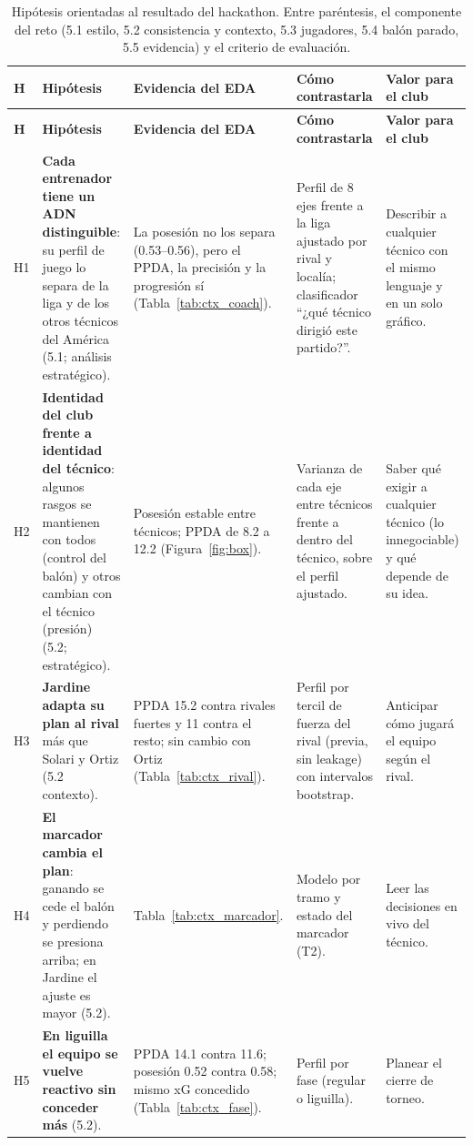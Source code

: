 \documentclass[11pt,a4paper]{article}
\begin{document}
{\small
\begin{longtable}{p{0.55cm}p{4.4cm}p{3.6cm}p{3.6cm}p{3.2cm}}
\caption{Hipótesis orientadas al resultado del hackathon. Entre paréntesis, el componente del reto (5.1 estilo, 5.2 consistencia y contexto, 5.3 jugadores, 5.4 balón parado, 5.5 evidencia) y el criterio de evaluación.}\label{tab:hipotesis}\\
\toprule \textbf{H} & \textbf{Hipótesis} & \textbf{Evidencia del EDA} & \textbf{Cómo contrastarla} & \textbf{Valor para el club}\\\midrule\endfirsthead
\toprule \textbf{H} & \textbf{Hipótesis} & \textbf{Evidencia del EDA} & \textbf{Cómo contrastarla} & \textbf{Valor para el club}\\\midrule\endhead
\bottomrule\endfoot
H1 & \textbf{Cada entrenador tiene un ADN distinguible}: su perfil de juego lo separa de la liga y de los otros técnicos del América (5.1; análisis estratégico). & La posesión no los separa (0.53--0.56), pero el PPDA, la precisión y la progresión sí (Tabla~\ref{tab:ctx_coach}). & Perfil de 8 ejes frente a la liga ajustado por rival y localía; clasificador ``¿qué técnico dirigió este partido?''. & Describir a cualquier técnico con el mismo lenguaje y en un solo gráfico.\\
H2 & \textbf{Identidad del club frente a identidad del técnico}: algunos rasgos se mantienen con todos (control del balón) y otros cambian con el técnico (presión) (5.2; estratégico). & Posesión estable entre técnicos; PPDA de 8.2 a 12.2 (Figura~\ref{fig:box}). & Varianza de cada eje entre técnicos frente a dentro del técnico, sobre el perfil ajustado. & Saber qué exigir a cualquier técnico (lo innegociable) y qué depende de su idea.\\
H3 & \textbf{Jardine adapta su plan al rival} más que Solari y Ortiz (5.2 contexto). & PPDA 15.2 contra rivales fuertes y 11 contra el resto; sin cambio con Ortiz (Tabla~\ref{tab:ctx_rival}). & Perfil por tercil de fuerza del rival (previa, sin leakage) con intervalos bootstrap. & Anticipar cómo jugará el equipo según el rival.\\
H4 & \textbf{El marcador cambia el plan}: ganando se cede el balón y perdiendo se presiona arriba; en Jardine el ajuste es mayor (5.2). & Tabla~\ref{tab:ctx_marcador}. & Modelo por tramo y estado del marcador (T2). & Leer las decisiones en vivo del técnico.\\
H5 & \textbf{En liguilla el equipo se vuelve reactivo sin conceder más} (5.2). & PPDA 14.1 contra 11.6; posesión 0.52 contra 0.58; mismo xG concedido (Tabla~\ref{tab:ctx_fase}). & Perfil por fase (regular o liguilla). & Planear el cierre de torneo.\\

\end{longtable}}
\end{document}
